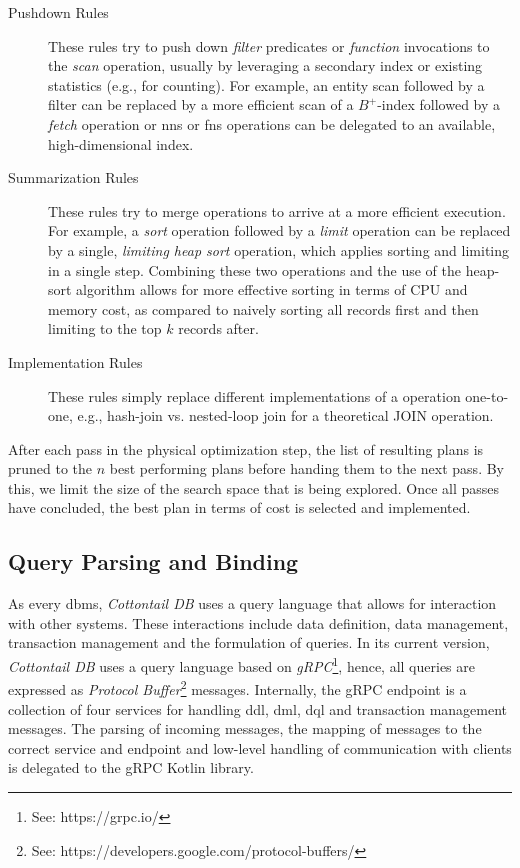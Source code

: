 \begin{description}
    \item[Pushdown Rules] These rules try to push down \emph{filter} predicates or \emph{function} invocations to the \emph{scan} operation, usually by leveraging a secondary index or existing statistics (e.g., for counting). For example, an entity scan followed by a filter can be replaced by a more efficient scan of a $B^{+}$-index followed by a \emph{fetch} operation or \acrshort{nns} or \acrshort{fns} operations can be delegated to an available, high-dimensional index.
 
    \item[Summarization Rules] These rules try to merge operations to arrive at a more efficient execution. For example, a \emph{sort} operation followed by a \emph{limit} operation can be replaced by a single, \emph{limiting heap sort} operation, which applies sorting and limiting in a single step. Combining these two operations and the use of the heap-sort algorithm allows for more effective sorting in terms of CPU and memory cost, as compared to naively sorting all records first and then limiting to the top $k$ records after.
    
    \item[Implementation Rules] These rules simply replace different implementations of a operation one-to-one, e.g., hash-join vs. nested-loop join for a theoretical JOIN operation.
\end{description}

After each pass in the physical optimization step, the list of resulting plans is pruned to the $n$ best performing plans before handing them to the next pass. By this, we limit the size of the search space that is being explored. Once all passes have concluded, the best plan in terms of cost is selected and implemented.

\subsection{Query Parsing and Binding}
As every \acrshort{dbms}, \emph{Cottontail DB} uses a query language that allows for interaction with other systems. These interactions include data definition, data management, transaction management and the formulation of queries. In its current version, \emph{Cottontail DB} uses a query language based on \emph{gRPC}\footnote{See: https://grpc.io/}, hence, all queries are expressed as \emph{Protocol Buffer}\footnote{See: https://developers.google.com/protocol-buffers/} messages. Internally, the gRPC endpoint is a collection of four services for handling \acrshort{ddl}, \acrshort{dml}, \acrshort{dql} and transaction management messages. The parsing of incoming messages, the mapping of messages to the correct service and endpoint and low-level handling of communication with clients is delegated to the gRPC Kotlin library. 

